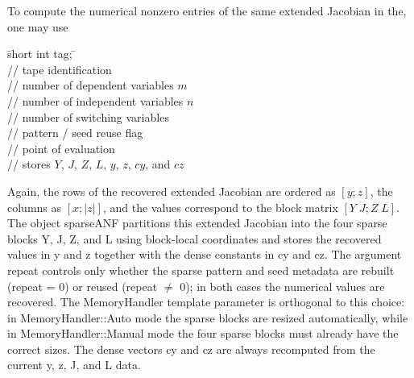 To compute the numerical nonzero entries of the same extended Jacobian in the, one may use
\begin{tabbing}
\hspace{0.5in}\={\sf short int tag;} \hspace{1.1in}\= \kill    %
\\
          \> // tape identification \\
                  \> // number of dependent variables $m$ \\
                  \> // number of independent variables $n$ \\
                  \> // number of switching variables \\
             \> // pattern / seed reuse flag \\
        \> // point of evaluation \\
 \> // stores $Y$, $J$, $Z$, $L$, $y$, $z$, $cy$, and $cz$ \\
\end{tabbing}
Again, the rows of the recovered extended Jacobian are ordered as $[y;z]$, the
columns as $[x;|z|]$, and the values correspond to the block matrix
$[Y\;J;Z\;L]$. The object {\sf sparseANF} partitions this extended Jacobian into
the four sparse blocks
{\sf Y}, {\sf J}, {\sf Z}, and {\sf L} using block-local coordinates and
stores the recovered values in {\sf y} and {\sf z} together with the dense
constants in {\sf cy} and {\sf cz}. The argument
{\sf repeat} controls only whether the sparse pattern and seed metadata are
rebuilt ({\sf repeat = 0}) or reused ({\sf repeat $\neq$ 0}); in both cases the
numerical values are recovered. The {\sf MemoryHandler} template parameter is
orthogonal to this choice: in {\sf MemoryHandler::Auto} mode the sparse blocks
are resized automatically, while in {\sf MemoryHandler::Manual} mode the four
sparse blocks must already have the correct sizes. The dense vectors
{\sf cy} and {\sf cz} are always recomputed from the current {\sf y},
{\sf z}, {\sf J}, and {\sf L} data.
